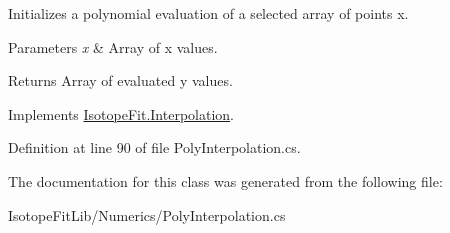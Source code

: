 Initializes a polynomial evaluation of a selected array of points x. 


\begin{DoxyParams}{Parameters}
{\em x} & Array of x values.\\
\hline
\end{DoxyParams}
\begin{DoxyReturn}{Returns}
Array of evaluated y values.
\end{DoxyReturn}


Implements \hyperlink{class_isotope_fit_1_1_interpolation}{Isotope\+Fit.\+Interpolation}.



Definition at line 90 of file Poly\+Interpolation.\+cs.



The documentation for this class was generated from the following file\+:\begin{DoxyCompactItemize}
\item 
Isotope\+Fit\+Lib/\+Numerics/Poly\+Interpolation.\+cs\end{DoxyCompactItemize}
